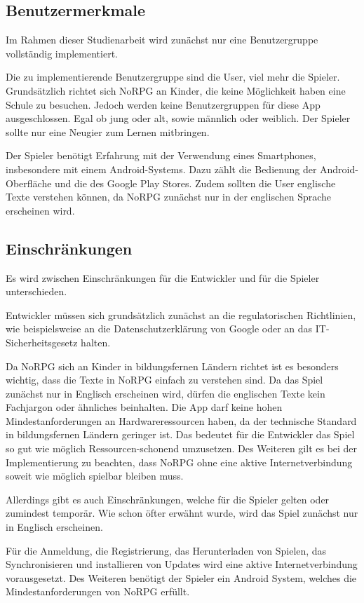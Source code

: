 	\subsection{Benutzermerkmale}
		Im Rahmen dieser Studienarbeit wird zunächst nur eine Benutzergruppe vollständig implementiert.
		
		Die zu implementierende Benutzergruppe sind die User, viel mehr die Spieler. Grundsätzlich richtet sich NoRPG an Kinder, die keine Möglichkeit haben eine Schule zu besuchen. Jedoch werden keine Benutzergruppen für diese App ausgeschlossen. Egal ob jung oder alt, sowie männlich oder weiblich. Der Spieler sollte nur eine Neugier zum Lernen mitbringen. 
		
		Der Spieler benötigt Erfahrung mit der Verwendung eines Smartphones, insbesondere mit einem Android-Systems. Dazu zählt die Bedienung der Android-Oberfläche und die des Google Play Stores. Zudem sollten die User englische Texte verstehen können, da NoRPG zunächst nur in der englischen Sprache erscheinen wird.
			
	\subsection{Einschränkungen}
		Es wird zwischen Einschränkungen für die Entwickler und für die Spieler unterschieden.
		
		Entwickler müssen sich grundsätzlich zunächst an die regulatorischen Richtlinien, wie beispielsweise an die Datenschutzerklärung von Google oder an das IT-Sicherheitsgesetz halten.
		
		Da NoRPG sich an Kinder in bildungsfernen Ländern richtet ist es besonders wichtig, dass die Texte in NoRPG einfach zu verstehen sind. Da das Spiel zunächst nur in Englisch erscheinen wird, dürfen die englischen Texte kein Fachjargon oder ähnliches beinhalten. Die App darf keine hohen Mindestanforderungen an Hardwareressourcen haben, da der technische Standard in bildungsfernen Ländern geringer ist. Das bedeutet für die Entwickler das Spiel so gut wie möglich Ressourcen-schonend umzusetzen. Des Weiteren gilt es bei der Implementierung zu beachten, dass NoRPG ohne eine aktive Internetverbindung soweit wie möglich spielbar bleiben muss.
		
		Allerdings gibt es auch Einschränkungen, welche für die Spieler gelten oder zumindest temporär. Wie schon öfter erwähnt wurde, wird das Spiel zunächst nur in Englisch erscheinen. 
		
		Für die Anmeldung, die Registrierung, das Herunterladen von Spielen, das Synchronisieren und installieren von Updates wird eine aktive Internetverbindung vorausgesetzt. Des Weiteren benötigt der Spieler ein Android System, welches die Mindestanforderungen von NoRPG erfüllt.
				
